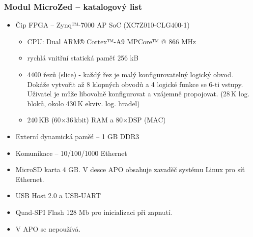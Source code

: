 \documentclass{beamer}
\begin{document}
\begin{frame}
\frametitle{Modul MicroZed -- katalogový list}

\begin{itemize}
 \item Čip FPGA – Zynq™-7000 AP SoC (XC7Z010-CLG400-1)
 \begin{itemize}
  \item CPU: Dual ARM® Cortex™-A9 MPCore™ @ 866 MHz
  \item rychlá vnitřní statická paměť 256 kB
  \item 4400 řezů (slice) - každý řez je malý konfigurovatelný logický obvod.
    Dokáže vytvořit až 8 klopných obvodů a 4 logické funkce se 6-ti vstupy.
    Uživatel je může libovolně konfigurovat a vzájemně propojovat. (28\,K log. bloků, okolo 430\,K ekviv. log. hradel)
  \item 240\,KB (60$\times$36\,kbit) RAM a 80$\times$DSP (MAC)

 \end{itemize}
 \item Externí dynamická paměť – 1 GB DDR3
 \item Komunikace – 10/100/1000 Ethernet
 \item MicroSD karta 4 GB. V desce APO obsahuje zavaděč systému Linux pro síť Ethernet.
 \item USB Host 2.0 a USB-UART
 \item Quad-SPI Flash 128 Mb pro inicializaci při zapnutí.
 \item V APO se nepoužívá.
\end{itemize}
\end{frame}
\end{document}
